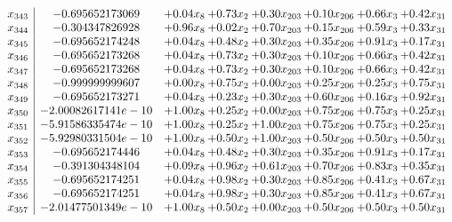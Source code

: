 \documentclass[8pt]{article}
\begin{document}
\[\begin{array}{c| c c@{\hskip 2pt} c@{\hskip 2pt} c@{\hskip 2pt} c@{\hskip 2pt} c@{\hskip 2pt} c@{\hskip 2pt} }
 x_{343}   &  -0.695652173069 & +  0.04 x_{8} & +  0.73 x_{2} & +  0.30 x_{203} & +  0.10 x_{206} & +  0.66 x_{3} & +  0.42 x_{31}\\
 x_{344}   &  -0.304347826928 & +  0.96 x_{8} & +  0.02 x_{2} & +  0.70 x_{203} & +  0.15 x_{206} & +  0.59 x_{3} & +  0.33 x_{31}\\
 x_{345}   &  -0.695652174248 & +  0.04 x_{8} & +  0.48 x_{2} & +  0.30 x_{203} & +  0.35 x_{206} & +  0.91 x_{3} & +  0.17 x_{31}\\
 x_{346}   &  -0.695652173268 & +  0.04 x_{8} & +  0.73 x_{2} & +  0.30 x_{203} & +  0.10 x_{206} & +  0.66 x_{3} & +  0.42 x_{31}\\
 x_{347}   &  -0.695652173268 & +  0.04 x_{8} & +  0.73 x_{2} & +  0.30 x_{203} & +  0.10 x_{206} & +  0.66 x_{3} & +  0.42 x_{31}\\
 x_{348}   &  -0.999999999607 & +  0.00 x_{8} & +  0.75 x_{2} & +  0.00 x_{203} & +  0.25 x_{206} & +  0.25 x_{3} & +  0.75 x_{31}\\
 x_{349}   &  -0.695652173271 & +  0.04 x_{8} & +  0.23 x_{2} & +  0.30 x_{203} & +  0.60 x_{206} & +  0.16 x_{3} & +  0.92 x_{31}\\
 x_{350}   &  -2.00082617141e-10 & +  1.00 x_{8} & +  0.25 x_{2} & +  0.00 x_{203} & +  0.75 x_{206} & +  0.75 x_{3} & +  0.25 x_{31}\\
 x_{351}   &  -5.91586335474e-10 & +  1.00 x_{8} & +  0.25 x_{2} & +  1.00 x_{203} & +  0.75 x_{206} & +  0.75 x_{3} & +  0.25 x_{31}\\
 x_{352}   &  -5.92980331504e-10 & +  1.00 x_{8} & +  0.50 x_{2} & +  1.00 x_{203} & +  0.50 x_{206} & +  0.50 x_{3} & +  0.50 x_{31}\\
 x_{353}   &  -0.695652174446 & +  0.04 x_{8} & +  0.48 x_{2} & +  0.30 x_{203} & +  0.35 x_{206} & +  0.91 x_{3} & +  0.17 x_{31}\\
 x_{354}   &  -0.391304348104 & +  0.09 x_{8} & +  0.96 x_{2} & +  0.61 x_{203} & +  0.70 x_{206} & +  0.83 x_{3} & +  0.35 x_{31}\\
 x_{355}   &  -0.695652174251 & +  0.04 x_{8} & +  0.98 x_{2} & +  0.30 x_{203} & +  0.85 x_{206} & +  0.41 x_{3} & +  0.67 x_{31}\\
 x_{356}   &  -0.695652174251 & +  0.04 x_{8} & +  0.98 x_{2} & +  0.30 x_{203} & +  0.85 x_{206} & +  0.41 x_{3} & +  0.67 x_{31}\\
 x_{357}   &  -2.01477501349e-10 & +  1.00 x_{8} & +  0.50 x_{2} & +  0.00 x_{203} & +  0.50 x_{206} & +  0.50 x_{3} & +  0.50 x_{31}\\

\end{array}\]
\end{document}
